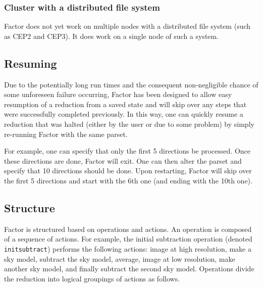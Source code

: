 \documentclass[structabstract]{article}
\begin{document}
\subsubsection{Cluster with a distributed file system}
Factor does not yet work on multiple nodes with a distributed file system (such
as CEP2 and CEP3). It does work on a single node of such a system.


\subsection{Resuming}
\label{factor:resuming}

Due to the potentially long run times and the consequent non-negligible chance
of some unforeseen failure occurring, Factor has been designed to allow easy
resumption of a reduction from a saved state and will skip over any steps that
were successfully completed previously. In this way, one can quickly resume a
reduction that was halted (either by the user or due to some problem) by simply
re-running Factor with the same parset.

For example, one can specify that only the first 5 directions be processed.
Once these directions are done, Factor will exit. One can then alter the parset
and specify that 10 directions should be done. Upon restarting, Factor will skip
over the first 5 directions and start with the 6th one (and ending with the 10th
one).


\subsection{Structure}
\label{factor:structure}

Factor is structured based on operations and actions. An operation is composed
of a sequence of actions. For example, the initial subtraction operation
(denoted {\tt initsubtract}) performs the following actions: image at high resolution,
make a sky model, subtract the sky model, average, image at low resolution,
make another sky model, and finally subtract the second sky model. Operations
divide the reduction into logical groupings of actions as follows.
\end{document}
